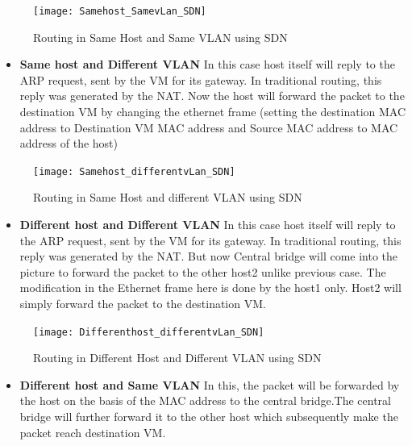 \begin{figure}[h]
\caption{Routing in Same Host and Same VLAN using SDN}
\centering
\texttt{[image: Samehost\_SamevLan\_SDN]}
\end{figure}

\pagebreak 

\begin{itemize}
    \item \textbf{Same host and Different VLAN} In this case host itself will reply to the ARP request, sent by the VM for its gateway. In traditional routing, this reply was generated by the NAT. Now the host will forward the packet to the destination VM by changing the ethernet frame (setting the destination MAC address to Destination VM MAC address and Source MAC address to MAC address of the host)
\end{itemize}

\begin{figure}[h]
\caption{Routing in Same Host and different VLAN using SDN}
\centering
\texttt{[image: Samehost\_differentvLan\_SDN]}
\end{figure}

\pagebreak

\begin{itemize}
    \item \textbf{Different host and Different VLAN} In this case host itself will reply to the ARP request, sent by the VM for its gateway. In traditional routing, this reply was generated by the NAT. But now Central bridge will come into the picture to forward the packet to the other host2 unlike previous case. The modification in the Ethernet frame here is done by the host1 only. Host2 will simply forward the packet to the destination VM.
\end{itemize}

\begin{figure}[h]
\caption{Routing in Different Host and Different VLAN using SDN}
\centering
\texttt{[image: Differenthost\_differentvLan\_SDN]}
\end{figure}


\pagebreak

\begin{itemize}
    \item \textbf{Different host and Same VLAN} In this, the packet will be forwarded by the host on the basis of the MAC address to the central bridge.The central bridge will further forward it to the other host which subsequently make the packet reach destination VM.
\end{itemize}

